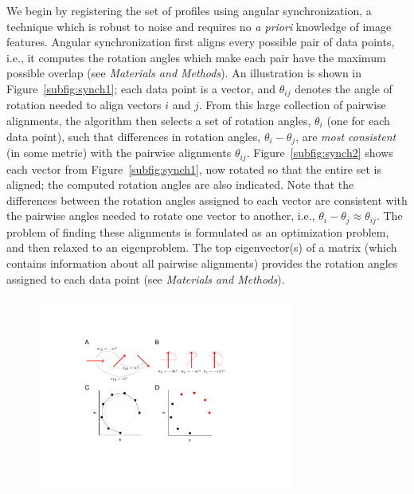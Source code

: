 \documentclass{pnastwo}
\begin{document}
\begin{article}
We begin by registering the set of profiles using angular synchronization\cite{singer2011angular}, a technique which is robust to noise and requires no {\em a priori} knowledge of image features.
%
Angular synchronization first aligns every possible pair of data points, i.e., it computes the rotation angles
which make each pair have the maximum possible overlap (see {\it Materials and Methods}).
%
An illustration is shown in Figure~\ref{subfig:synch1};
each data point is a vector, and $\theta_{ij}$ denotes the angle of rotation needed to align vectors $i$ and $j$.
%
From this large collection of pairwise alignments, the algorithm then selects a set of rotation angles, $\theta_i$ (one for each data point), such that differences in rotation angles, $\theta_i-\theta_j$, are {\em most consistent} (in some metric) with the pairwise alignments $\theta_{ij}$.
%
Figure~\ref{subfig:synch2} shows each vector from Figure~\ref{subfig:synch1}, now rotated so that the entire set is aligned; the computed rotation angles are also indicated.
%
Note that the differences between the rotation angles assigned to each vector are consistent with the pairwise angles needed to rotate one vector to another, i.e., $\theta_i - \theta_j \approx \theta_{ij}$.
%
The problem of finding these alignments is formulated as an optimization problem, and then relaxed to an eigenproblem.
%
The top eigenvector(s) of a matrix (which contains information about all pairwise alignments)
provides the rotation angles assigned to each data point (see {\it Materials and Methods}).
%
%
\begin{figure}[t]
\includegraphics[width=8.4cm]{fig4}

\end{figure}
\end{article}
\end{document}
